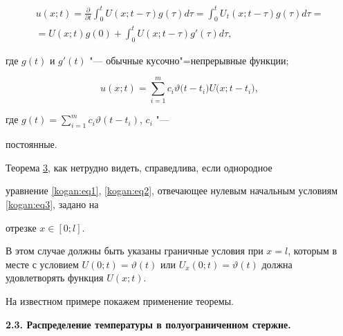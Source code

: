 \begin{multline}

\label{kogan:eq37}

u(x;t)=\frac{\partial }{\partial t}\int_0^t U(x;t-\tau )g(\tau )d\tau 

=\int_0^t U_t (x;t-\tau )g(\tau )d\tau =\\

=U(x;t)g(0)+\int _0^t U(x;t-\tau )g'(\tau )d\tau,

\end{multline}

где $g(t)$ и $g'(t)$ "--- обычные кусочно"=непрерывные функции;

\begin{equation}

\label{kogan:eq38}

u(x;t)=\sum\limits_{i=1}^m c_i \vartheta \big(t-t_i\big )U\big(x;t-t_i\big),

\end{equation}

где $g(t)=\sum\limits_{i=1}^m c_i \vartheta (t-t_i)$, $c_i$ "--- 

постоянные.



\smallskip



\begin{remark}[2] Теорема \hyperlink{kogan:th3}{3}, как нетрудно видеть, справедлива, если однородное 

уравнение \eqref{kogan:eq1}, \eqref{kogan:eq2}, отвечающее нулевым начальным условиям \eqref{kogan:eq3}, задано на 

отрезке $x\in [0;l]$. 

В этом случае должны быть указаны  граничные условия при $x=l$, которым в месте с условием $U(0;t)=\vartheta 

(t)$ или $U_x (0;t)=\vartheta (t)$ должна удовлетворять функция $U(x;t)$.

\end{remark}



\smallskip



На известном примере покажем применение теоремы.



\smallskip



{\bf 2.3. Распределение температуры в полуограниченном стержне.} \linebreak

